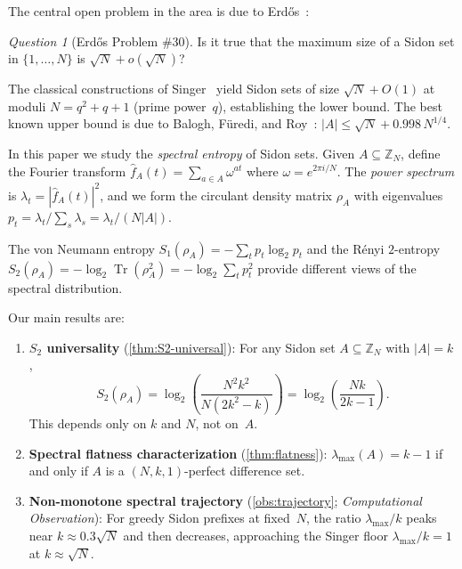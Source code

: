 \documentclass[11pt]{article}
\theoremstyle{definition}
\theoremstyle{remark}
\newtheorem{question}[theorem]{Question}
\newcommand{\Z}{\mathbb{Z}}
\newcommand{\fhat}{\widehat{f}}
\newcommand{\lmax}{\lambda_{\max}}
\newcommand{\Tr}{\operatorname{Tr}}
\begin{document}
The central open problem in the area is due to Erd\H{o}s~\cite{ET1941}:

\begin{question}[Erd\H{o}s Problem \#30]
Is it true that the maximum size of a Sidon set in $\{1,\ldots,N\}$
is $\sqrt{N} + o(\sqrt{N})$?
\end{question}

The classical constructions of Singer~\cite{Singer1938} yield Sidon
sets of size $\sqrt{N} + O(1)$ at moduli $N = q^2 + q + 1$ (prime
power~$q$), establishing the lower bound.
The best known upper bound is due to Balogh, F\"uredi, and
Roy~\cite{BFR2023}: $|A| \le \sqrt{N} + 0.998\,N^{1/4}$.

\medskip

In this paper we study the \emph{spectral entropy} of Sidon sets.
Given $A \subseteq \Z_N$, define the Fourier transform
$\fhat_A(t) = \sum_{a \in A} \omega^{at}$ where
$\omega = e^{2\pi i/N}$.  The \emph{power spectrum} is
$\lambda_t = |\fhat_A(t)|^2$, and we form the circulant density
matrix $\rho_A$ with eigenvalues
$p_t = \lambda_t / \sum_s \lambda_s = \lambda_t / (N|A|)$.

The von Neumann entropy $S_1(\rho_A) = -\sum_t p_t \log_2 p_t$ and
the R\'enyi $2$-entropy
$S_2(\rho_A) = -\log_2 \Tr(\rho_A^2) = -\log_2 \sum_t p_t^2$
provide different views of the spectral distribution.

Our main results are:

\begin{enumerate}[label=(\roman*)]
\item \textbf{$S_2$ universality} (\cref{thm:S2-universal}):
For any Sidon set $A \subseteq \Z_N$ with $|A| = k$,
\[
  S_2(\rho_A) = \log_2\!\left(\frac{N^2 k^2}{N(2k^2 - k)}\right)
  = \log_2\!\left(\frac{Nk}{2k - 1}\right).
\]
This depends only on $k$ and $N$, not on~$A$.

\item \textbf{Spectral flatness characterization}
(\cref{thm:flatness}):
$\lmax(A) = k - 1$ if and only if $A$ is a
$(N, k, 1)$-perfect difference set.

\item \textbf{Non-monotone spectral trajectory}
(\cref{obs:trajectory}; \emph{Computational Observation}):
For greedy Sidon prefixes at fixed~$N$, the ratio $\lmax/k$ peaks
near $k \approx 0.3\sqrt{N}$ and then decreases, approaching the
Singer floor $\lmax/k = 1$ at $k \approx \sqrt{N}$.
\end{enumerate}
\end{document}
